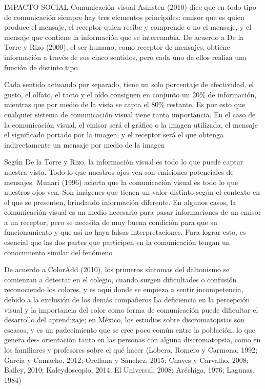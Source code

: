 \documentclass[10pt]{article}
\begin{document}
IMPACTO SOCIAL
Comunicación visual
Asinsten (2010) dice que en todo tipo de comunicación siempre hay tres elementos principales: emisor que es quien produce el mensaje, el receptor quien recibe y comprende o no el mensaje, y el mensaje que contiene la información que se intercambia. De acuerdo a De la Torre y Rizo (2000), el ser humano, como receptor de mensajes, obtiene información a través de sus cinco sentidos, pero cada uno de ellos realiza una función de distinto tipo \cite{IEEEreferencias:Ref32}

Cada sentido actuando por separado, tiene un solo porcentaje de efectividad, el gusto, el olfato, el tacto y el oído consiguen en conjunto un 20\% de información, mientras que por medio de la vista se capta el 80\% restante. Es por esto que cualquier sistema de comunicación visual tiene tanta importancia. En el caso de la comunicación visual, el emisor será el gráfico o la imagen utilizada, el mensaje el significado portado por la imagen, y el receptor será el que obtenga indirectamente un mensaje por medio de la imagen \cite{IEEEreferencias:Ref32}

Según De la Torre y Rizo, la información visual es todo lo que puede captar nuestra vista. Todo lo que nuestros ojos ven son emisiones potenciales de mensajes. Munari (1996) acierta que la comunicación visual es todo lo que nuestros ojos ven. Son imágenes que tienen un valor distinto según el contexto en el que se presenten, brindando información diferente. En algunos casos, la comunicación visual es un medio necesario para pasar informaciones de un emisor a un receptor, pero se necesita de muy buena condición para que su funcionamiento y que así no haya falsas interpretaciones. Para lograr esto, es esencial que las dos partes que participen en la comunicación tengan un conocimiento similar del fenómeno \cite{IEEEreferencias:Ref32}

De acuerdo a ColorAdd (2010), los primeros síntomas del daltonismo se comienzan a detectar en el colegio, cuando surgen dificultades o confusión reconociendo los colores, y es aquí donde se empieza a sentir incompetencia, debido a la exclusión de los demás compañeros \cite{IEEEreferencias:Ref32}
La deficiencia en la percepción visual y la importancia del color como forma de comunicación puede dificultar el desarrollo del aprendizaje; en México, los estudios sobre discromatopsias son escasos, y es un padecimiento que se cree poco común entre la población, lo que genera des- orientación tanto en las personas con alguna discromatopsia, como en los familiares y profesores sobre el qué hacer (Lobera, Romero y Carmona, 1992; García y Camacho, 2012; Orellana y Sánchez, 2015; Chaves y Carvalho, 2008; Bailey, 2010; Kaleydoscopio, 2014; El Universal, 2008; Aréchiga, 1976; Lagunas, 1984) \cite{IEEEreferencias:Ref27}
\end{document}
